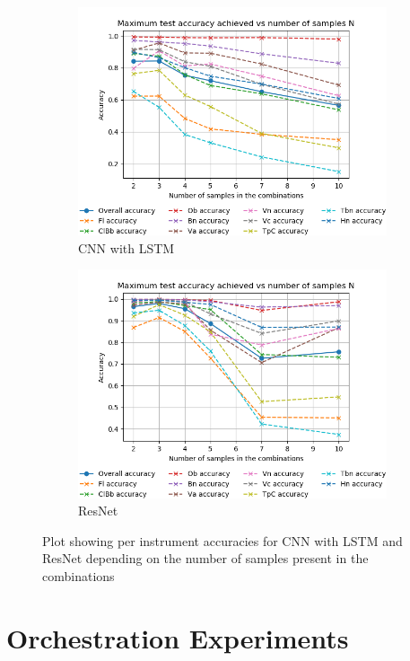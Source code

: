 \documentclass[runningheads,a4paper]{llncs}
\begin{document}
\begin{figure}[h]
  \centering
  \begin{subfigure}{.52\textwidth}
    \centering
    \includegraphics[width=0.9\linewidth]{../ISMIR_2020/figs/Acc_vs_N_CNN.png}
    \caption{CNN with LSTM}
    \label{best_acc_cnn}
  \end{subfigure}%
  \begin{subfigure}{.52\textwidth}
    \centering
    \includegraphics[width=0.9\linewidth]{../ISMIR_2020/figs/Acc_vs_N_ResNet.png}
    \caption{ResNet}
    \label{best_acc_resnet}
  \end{subfigure}
  \caption{Plot showing per instrument accuracies for CNN with LSTM and ResNet depending on the number of samples present in the combinations}
  \end{figure}

\section{Orchestration Experiments}
\label{sec:orchestration}
\end{document}
